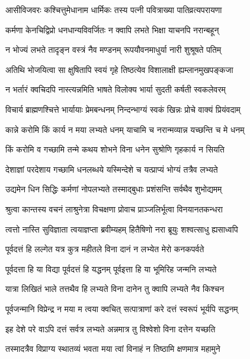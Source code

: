 \twolineshloka
{आसीविजवरः कश्चित्तुमेधानाम धार्मिकः}
{तस्य पत्नी पवित्राख्या पातिव्रत्यपरायणा} %

\twolineshloka
{कर्मणा केनचिद्विप्रो धनधान्यविवर्जितः}
{न क्वापि लभते भिक्षा याचनपि नरान्बहून्} %

\twolineshloka
{न भोज्यं लभते तादृङ्न वस्त्रं नैव मण्डनम्}
{रूपयौवनमाधुर्या नारी शुश्रूषते पतिम्} %

\twolineshloka
{अतिथि भोजयित्वा सा क्षुषितापि स्वयं गृहे}
{तिष्ठत्येव विशालाक्षी ह्यम्लानमुखपङ्कजा} %

\twolineshloka
{न भर्तारं क्वचिदपि नास्त्यन्नमिति भाषते}
{विलोक्य भार्या सुदती कर्षती स्वकलेवरम्} %

\twolineshloka
{विचार्य ब्राह्मणश्चित्ते भार्यायाः प्रेमबन्धनम्}
{निन्दन्भाग्यं स्वकं खिन्नः प्रोचे वाक्यं प्रियंवदाम्} %

\twolineshloka
{कान्ने करोमि किं कार्य न मया लभ्यते धनम्}
{याचामि च नरान्मव्यान्न यच्छन्ति च मे धनम्} %

\twolineshloka
{किं करोमि व गच्छामि तन्मे कथय शोभने}
{विना धनेन सुश्रोणि गृहकार्य न सियति} %

\twolineshloka
{देशाज्ञां परदेशाय गच्छामि धनलब्धये}
{यस्मिन्देशे च यत्प्राप्यं भोग्यं तत्रैव लभ्यते} %

\twolineshloka
{उद्यमेन धिन सिद्धिः कर्मणां नोपलभ्यते}
{तस्माद्बुधाः प्रशंसन्ति सर्वथैव शुभोद्यमम्} %

\twolineshloka
{श्रुत्वा कान्तस्य वचनं लाश्रुनेत्रा विचक्षणा}
{प्रोवाच प्राञ्जलिर्भूत्वा विनयानतकन्धरा} %

\twolineshloka
{त्वत्तो नास्ति सुविज्ञाता त्वयाज्ञप्ता ब्रवीम्यहम्}
{हितैषिणो नरा ब्रूयुः शश्वत्साधु ह्यसाध्वपि} %

\twolineshloka
{पूर्वदत्तं हि लल्गेत यत्र कुत्र महीतले}
{विना दानं न लभ्येत मेरो कनकपर्वते} %

\twolineshloka
{पूर्वदत्ता हि या विद्या पूर्वदत्तं हि यद्धनम्}
{पूर्वइत्ता हि या भूमिरिह जन्मनि लभ्यते} %

\twolineshloka
{यात्रा लिखितं भाले तत्तथैव हि लभ्यते}
{विना दानेन तु क्वापि लभ्यते नैव किश्चन} %

\twolineshloka
{पूर्वजन्मानि विप्रेन्द्र न मया म त्वया क्वचित्}
{सत्पात्राणां करे दत्तं स्वरूपं भूर्यपि सद्धनम्} %

\twolineshloka
{इह देशे परे वाऽपि दत्तं सर्वत्र लभ्यते}
{अन्नमात्र तु विश्वेशो विना दत्तेन यच्छति} %

\twolineshloka
{तस्मादत्रैव विप्राग्य स्थातव्यं भवता मया}
{त्वां विनाहं न तिष्ठामि क्षणमात्र महामुने} %

